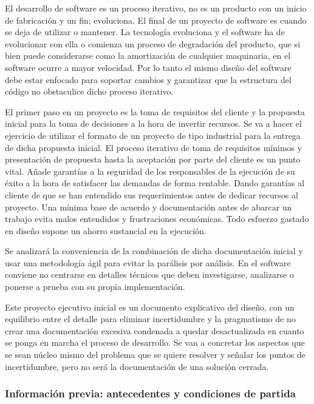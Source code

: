 El desarrollo de software es un proceso iterativo, no es un producto con un inicio de fabricación y un fin; evoluciona.
El final de un proyecto de software es cuando se deja de utilizar o mantener.
La tecnología evoluciona y el software ha de evolucionar con ella o comienza un proceso de degradación del producto, que si bien puede considerarse como la amortización de cualquier maquinaria, en el software ocurre a mayor velocidad.
Por lo tanto el mismo diseño del software debe estar enfocado para soportar cambios y garantizar que la estructura del código no obstaculice dicho proceso iterativo.

El primer paso en un proyecto es la toma de requisitos del cliente y la propuesta inicial para la toma de decisiones a la hora de invertir recursos.
Se va a hacer el ejercicio de utilizar el formato de un proyecto de tipo industrial para la entrega de dicha propuesta inicial.
El proceso iterativo de toma de requisitos mínimos y presentación de propuesta hasta la aceptación por parte del cliente es un punto vital.
Añade garantías a la seguridad de los responsables de la ejecución de su éxito a la hora de satisfacer las demandas de forma rentable.
Dando garantías al cliente de que se han entendido sus requerimientos antes de dedicar recursos al proyecto.
Una mínima base de acuerdo y documentación antes de abarcar un trabajo evita malos entendidos y frustraciones económicas.
Todo esfuerzo gastado en diseño supone un ahorro sustancial en la ejecución.

Se analizará la conveniencia de la combinación de dicha documentación inicial y usar una metodología ágil para evitar la parálisis por análisis.
En el software conviene no centrarse en detalles técnicos que deben investigarse, analizarse o ponerse a prueba con su propia implementación.

Este proyecto ejecutivo inicial es un documento explicativo del diseño, con un equilibrio entre el detalle para eliminar incertidumbre y la pragmatismo de no crear una documentación excesiva condenada a quedar desactualizada en cuanto se ponga en marcha el proceso de desarrollo.
Se van a concretar los aspectos que se sean núcleo mismo del problema que se quiere resolver y señalar los puntos de incertidumbre, pero no será la documentación de una solución cerrada.

\subsubsection{Información previa: antecedentes y condiciones de partida}

